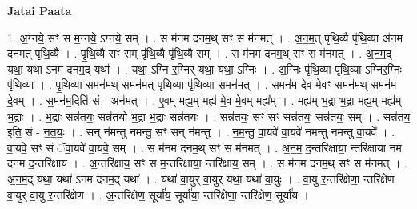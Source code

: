 \documentclass[17pt]{extarticle}
\begin{document}
\textbf{Jatai Paata} \newline

1. अ॒ग्नये॒ सꣳ स म॒ग्नये॒ ऽग्नये॒ सम् । . स म॑नम दनम॒थ् सꣳ स म॑नमत् । . अ॒न॒म॒त् पृ॒थि॒व्यै पृ॑थि॒व्या अ॑नम दनमत् पृथि॒व्यै । . पृ॒थि॒व्यै सꣳ सम् पृ॑थि॒व्यै पृ॑थि॒व्यै सम् । . स म॑नम दनम॒थ् सꣳ स म॑नमत् । . अ॒न॒म॒द् यथा॒ यथा॑ ऽनम दनम॒द् यथा᳚ । . यथा॒ ऽग्नि र॒ग्निर् यथा॒ यथा॒ ऽग्निः । . अ॒ग्निः पृ॑थि॒व्या पृ॑थि॒व्या ऽग्निर॒ग्निः पृ॑थि॒व्या । . पृ॒थि॒व्या स॒मन॑मथ् स॒मन॑मत् पृथि॒व्या पृ॑थि॒व्या स॒मन॑मत् । . स॒मन॑म दे॒व मे॒वꣳ स॒मन॑मथ् स॒मन॑म दे॒वम् । . स॒मन॑म॒दिति॑ सं - अन॑मत् । . ए॒वम् मह्य॒म् मह्य॑ मे॒व मे॒वम् मह्य᳚म् । . मह्य॑म् भ॒द्रा भ॒द्रा मह्य॒म् मह्य॑म् भ॒द्राः । . भ॒द्राः सन्न॑तयः॒ सन्न॑तयो भ॒द्रा भ॒द्राः सन्न॑तयः । . सन्न॑तयः॒ सꣳ सꣳ सन्न॑तयः॒ सन्न॑तयः॒ सम् । . सन्न॑तय॒ इति॒ सं - न॒त॒यः॒ । . सन् न॑मन्तु नमन्तु॒ सꣳ सन् न॑मन्तु । . न॒म॒न्तु॒ वा॒यवे॑ वा॒यवे॑ नमन्तु नमन्तु वा॒यवे᳚ । . वा॒यवे॒ सꣳ सं ॅवा॒यवे॑ वा॒यवे॒ सम् । . स म॑नम दनम॒थ् सꣳ स म॑नमत् । . अ॒न॒म॒ द॒न्तरि॑क्षाया॒ न्तरि॑क्षाया नम दनम द॒न्तरि॑क्षाय । . अ॒न्तरि॑क्षाय॒ सꣳ स म॒न्तरि॑क्षाया॒ न्तरि॑क्षाय॒ सम् । . स म॑नम दनम॒थ् सꣳ स म॑नमत् । . अ॒न॒म॒द् यथा॒ यथा॑ ऽनम दनम॒द् यथा᳚ । . यथा॑ वा॒युर् वा॒युर् यथा॒ यथा॑ वा॒युः । . वा॒यु र॒न्तरि॑क्षेणा॒ न्तरि॑क्षेण वा॒युर् वा॒यु र॒न्तरि॑क्षेण । . अ॒न्तरि॑क्षेण॒ सूर्या॑य॒ सूर्या॑या॒ न्तरि॑क्षेणा॒ न्तरि॑क्षेण॒ सूर्या॑य । \newline
\end{document}
